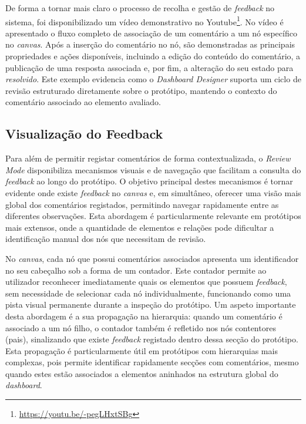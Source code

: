 De forma a tornar mais claro o processo de recolha e gestão de \textit{feedback} no sistema, foi disponibilizado um vídeo demonstrativo no Youtube\footnote{\url{https://youtu.be/-pegLHxtSBg}}. No vídeo é apresentado o fluxo completo de associação de um comentário a um nó específico no \textit{canvas}. Após a inserção do comentário no nó, são demonstradas as principais propriedades e ações disponíveis, incluindo a edição do conteúdo do comentário, a publicação de uma resposta associada e, por fim, a alteração do seu estado para \textit{resolvido}. Este exemplo evidencia como o \textit{Dashboard Designer} suporta um ciclo de revisão estruturado diretamente sobre o protótipo, mantendo o contexto do comentário associado ao elemento avaliado.

\subsection{Visualização do Feedback}
\label{subsec:cap4_visualizacao_feedback}

Para além de permitir registar comentários de forma contextualizada, o \textit{Review Mode} disponibiliza mecanismos visuais e de navegação que facilitam a consulta do \textit{feedback} ao longo do protótipo. O objetivo principal destes mecanismos é tornar evidente onde existe \textit{feedback} no \textit{canvas} e, em simultâneo, oferecer uma visão mais global dos comentários registados, permitindo navegar rapidamente entre as diferentes observações. Esta abordagem é particularmente relevante em protótipos mais extensos, onde a quantidade de elementos e relações pode dificultar a identificação manual dos nós que necessitam de revisão.

No \textit{canvas}, cada nó que possui comentários associados apresenta um identificador no seu cabeçalho sob a forma de um contador. Este contador permite ao utilizador reconhecer imediatamente quais os elementos que possuem \textit{feedback}, sem necessidade de selecionar cada nó individualmente, funcionando como uma pista visual permanente durante a inspeção do protótipo. Um aspeto importante desta abordagem é a sua propagação na hierarquia: quando um comentário é associado a um nó filho, o contador também é refletido nos nós contentores (pais), sinalizando que existe \textit{feedback} registado dentro dessa secção do protótipo. Esta propagação é particularmente útil em protótipos com hierarquias mais complexas, pois permite identificar rapidamente secções com comentários, mesmo quando estes estão associados a elementos aninhados na estrutura global do \textit{dashboard}.

